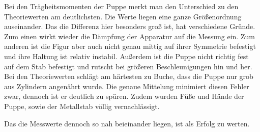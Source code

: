 Bei den Trägheitsmomenten der Puppe merkt man den Unterschied zu den Theoriewerten am deutlichsten. Die Werte liegen eine ganze Größenordnung auseinander. Das die Differenz hier besonders groß ist, hat verschiedene Gründe. Zum einen wirkt wieder die Dämpfung der Apparatur auf die Messung ein. Zum anderen ist die Figur aber auch nicht genau mittig auf ihrer Symmetrie befestigt und ihre Haltung ist relativ instabil. Außerdem ist die Puppe nicht richtig fest auf dem Stab befestigt und rutscht bei größeren Beschleunigungen hin und her.
Bei den Theoriewerten schlägt am härtesten zu Buche, dass die Puppe nur grob aus Zylindern angenährt wurde. Die genaue Mittelung minimiert diesen Fehler zwar, dennoch ist er deutlich zu spüren. Zudem wurden Füße und Hände der Puppe, sowie der Metallstab völlig vernachlässigt.

Das die Messwerte dennoch so nah beieinander liegen, ist als Erfolg zu werten.




